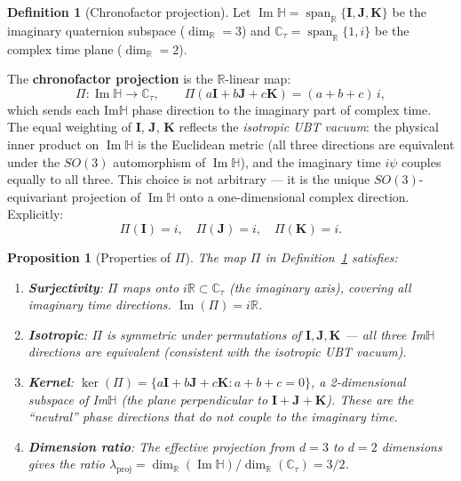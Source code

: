 \documentclass[12pt,a4paper]{article}
\newtheorem{proposition}[theorem]{Proposition}
\theoremstyle{definition}
\newtheorem{definition}[theorem]{Definition}
\theoremstyle{remark}
\begin{document}
\begin{definition}[Chronofactor projection]
\label{def:chron:Pi}
Let $\operatorname{Im}\mathbb{H} = \operatorname{span}_\mathbb{R}\{\mathbf{I}, \mathbf{J}, \mathbf{K}\}$
be the imaginary quaternion subspace ($\dim_\mathbb{R} = 3$) and
$\mathbb{C}_\tau = \operatorname{span}_\mathbb{R}\{1, i\}$ be the complex time plane
($\dim_\mathbb{R} = 2$).

The \textbf{chronofactor projection} is the $\mathbb{R}$-linear map:
\begin{equation}
  \Pi: \operatorname{Im}\mathbb{H} \to \mathbb{C}_\tau,
  \qquad
  \Pi(a\mathbf{I} + b\mathbf{J} + c\mathbf{K}) = (a + b + c)\,i,
  \label{eq:chron:Pi}
\end{equation}
which sends each Im$\mathbb{H}$ phase direction to the imaginary part of complex time.
The equal weighting of $\mathbf{I}$, $\mathbf{J}$, $\mathbf{K}$ reflects the
\emph{isotropic UBT vacuum}: the physical inner product on
$\operatorname{Im}\mathbb{H}$ is the Euclidean metric (all three directions are
equivalent under the $SO(3)$ automorphism of $\operatorname{Im}\mathbb{H}$), and
the imaginary time $i\psi$ couples equally to all three.
This choice is not arbitrary — it is the unique $SO(3)$-equivariant projection
of $\operatorname{Im}\mathbb{H}$ onto a one-dimensional complex direction.
Explicitly:
\begin{equation}
  \Pi(\mathbf{I}) = i, \quad
  \Pi(\mathbf{J}) = i, \quad
  \Pi(\mathbf{K}) = i.
  \label{eq:chron:Pi_basis}
\end{equation}
\end{definition}

\begin{proposition}[Properties of $\Pi$]
\label{prop:chron:Pi_props}
The map $\Pi$ in Definition~\ref{def:chron:Pi} satisfies:
\begin{enumerate}
  \item \textbf{Surjectivity}: $\Pi$ maps onto $i\mathbb{R} \subset \mathbb{C}_\tau$
        (the imaginary axis), covering all imaginary time directions. $\operatorname{Im}(\Pi) = i\mathbb{R}$.
  \item \textbf{Isotropic}: $\Pi$ is symmetric under permutations of $\mathbf{I},\mathbf{J},\mathbf{K}$
        — all three Im$\mathbb{H}$ directions are equivalent (consistent with the
        isotropic UBT vacuum).
  \item \textbf{Kernel}: $\ker(\Pi) = \{a\mathbf{I}+b\mathbf{J}+c\mathbf{K} : a+b+c=0\}$,
        a 2-dimensional subspace of Im$\mathbb{H}$ (the plane perpendicular to
        $\mathbf{I}+\mathbf{J}+\mathbf{K}$).  These are the ``neutral'' phase directions
        that do not couple to the imaginary time.
  \item \textbf{Dimension ratio}: The effective projection from $d=3$ to $d=2$ dimensions
        gives the ratio $\lambda_{\mathrm{proj}} = \dim_\mathbb{R}(\operatorname{Im}\mathbb{H})\big/\dim_\mathbb{R}(\mathbb{C}_\tau) = 3/2$.
\end{enumerate}
\end{proposition}
\end{document}
